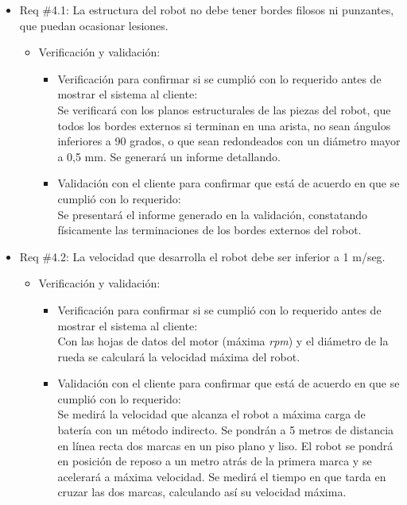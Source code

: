 \documentclass[11pt]{charter}
\begin{document}
\begin{itemize}
\item Req \#4.1: La estructura del robot no debe tener bordes filosos ni punzantes, que puedan ocasionar lesiones. 
\begin{itemize}
\item Verificación y validación:
	\begin{itemize}
	\item Verificación para confirmar si se cumplió con lo requerido 	antes de mostrar el sistema al cliente:\\
	Se verificará con los planos estructurales de las piezas del
	robot, que todos los bordes externos si terminan en una arista,
	no sean ángulos inferiores a 90 grados, o que sean redondeados
	con un diámetro mayor a 0,5 mm. Se generará un informe
	detallando.
	\item Validación con el cliente para confirmar que está de 				acuerdo en que se cumplió con lo requerido:\\
	Se presentará el informe generado en la validación, constatando  
	físicamente las terminaciones de los bordes externos del robot.
	\end{itemize}
\end{itemize}
\end{itemize}

\begin{itemize}
\item Req \#4.2: La velocidad que desarrolla el robot debe ser inferior a 1 m/seg. 
\begin{itemize}
\item Verificación y validación:
	\begin{itemize}
	\item Verificación para confirmar si se cumplió con lo requerido 	antes de mostrar el sistema al cliente:\\
 	Con las hojas de datos del motor (máxima \textit{rpm}) y el
 	diámetro de la rueda se calculará la velocidad máxima del robot.
	\item Validación con el cliente para confirmar que está de 				acuerdo en que se cumplió con lo requerido:\\
	Se medirá la velocidad que alcanza el robot a máxima carga de
	batería con un método indirecto. Se pondrán a 5 metros de
	distancia en línea recta dos marcas en un piso plano y liso. El
	robot se pondrá en posición de reposo a un metro atrás de la
	primera marca y se acelerará a máxima velocidad. Se medirá el
	tiempo en que tarda en cruzar las dos marcas, calculando así su
	velocidad máxima.   
	\end{itemize}
\end{itemize}
\end{itemize}
\end{document}
